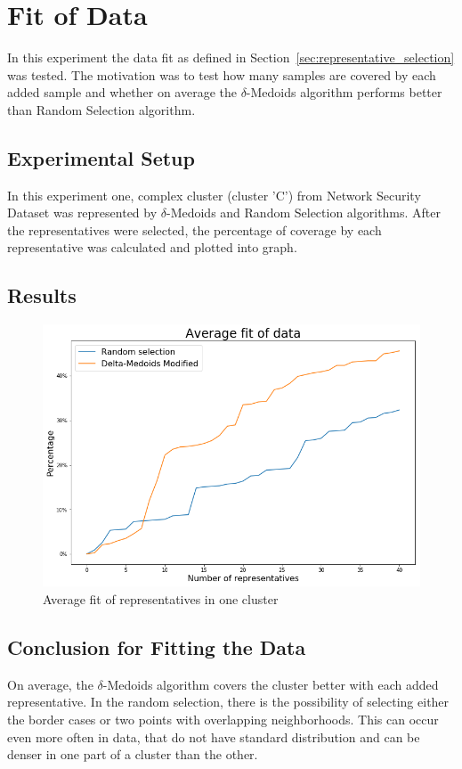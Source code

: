 \documentclass[thesis=B,english]{FITthesis}[2012/10/20]
\begin{document}
\section{Fit of Data}\label{sec:exp5}

In this experiment the data fit as defined in Section~\ref{sec:representative_selection} was tested.
The motivation was to test how many samples are covered by each added sample and whether on average the $\delta$-Medoids algorithm performs better than Random Selection algorithm.

\subsection{Experimental Setup}
In this experiment one, complex cluster (cluster 'C') from Network Security Dataset was represented by $\delta$-Medoids and Random Selection algorithms.
After the representatives were selected, the percentage of coverage by each representative was calculated and plotted into graph.

\subsection{Results}

\begin{figure}[H]
  \includegraphics[width=\linewidth]{img/exp5.png}
  \caption{Average fit of representatives in one cluster}
  \label{img:exp5}
\end{figure}

\subsection{Conclusion for Fitting the Data}
On average, the $\delta$-Medoids algorithm covers the cluster better with each added representative.
In the random selection, there is the possibility of selecting either the border cases or two points with overlapping neighborhoods.
This can occur even more often in data, that do not have standard distribution and can be denser in one part of a cluster than the other.
\end{document}
